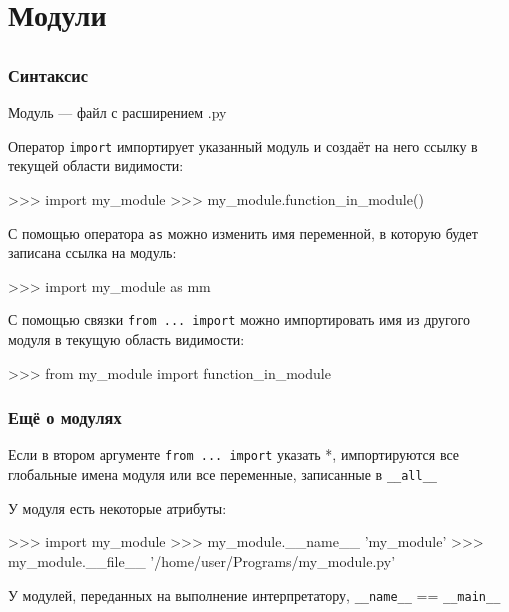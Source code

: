 \documentclass[fleqn, xcolor=x11names, 11pt]{beamer}
\begin{document}
\section{Модули}
\subsection*{}

\begin{frame}[fragile]\frametitle{Синтаксис}

Модуль --- файл с расширением .py

\hfill

Оператор \texttt{import} импортирует указанный модуль и создаёт на него ссылку в текущей области видимости:

\begin{pcode}
>>> import my_module
>>> my_module.function_in_module()
\end{pcode}

\hfill

С помощью оператора \texttt{as} можно изменить имя переменной, в которую будет записана ссылка на модуль:

\begin{pcode}
>>> import my_module as mm
\end{pcode}

\hfill

С помощью связки \texttt{from ... import} можно импортировать имя из другого модуля в текущую область видимости:

\begin{pcode}
>>> from my_module import function_in_module
\end{pcode}

\hfill

\end{frame}


\begin{frame}[fragile]\frametitle{Ещё о модулях}

Если в втором аргументе \texttt{from ... import} указать *, импортируются все глобальные имена модуля или все переменные, записанные в \texttt{__all__}

\hfill

У модуля есть некоторые атрибуты:

\begin{pcode}
>>> import my_module
>>> my_module.__name__
'my_module'
>>> my_module.__file__
'/home/user/Programs/my_module.py'
\end{pcode}

\hfill

У модулей, переданных на выполнение интерпретатору, \texttt{__name__} == \texttt{__main__}


\end{frame}
\end{document}
